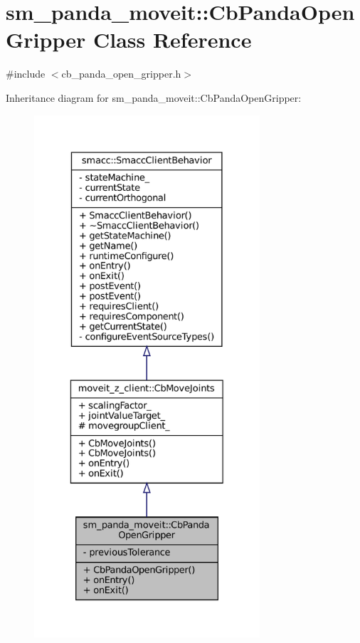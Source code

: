 \hypertarget{classsm__panda__moveit_1_1CbPandaOpenGripper}{}\section{sm\+\_\+panda\+\_\+moveit\+:\+:Cb\+Panda\+Open\+Gripper Class Reference}
\label{classsm__panda__moveit_1_1CbPandaOpenGripper}


{\ttfamily \#include $<$cb\+\_\+panda\+\_\+open\+\_\+gripper.\+h$>$}



Inheritance diagram for sm\+\_\+panda\+\_\+moveit\+:\+:Cb\+Panda\+Open\+Gripper\+:
\nopagebreak
\begin{figure}[H]
\begin{center}
\leavevmode
\includegraphics[height=550pt]{classsm__panda__moveit_1_1CbPandaOpenGripper__inherit__graph}
\end{center}
\end{figure}


